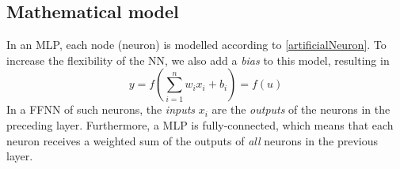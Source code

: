 \documentclass[twoside,english]{uiofysmaster}
\begin{document}
\subsection{Mathematical model} \label{sec:MLPmodel}
In an MLP, each node (neuron) is modelled according to \eqref{artificialNeuron}. To increase the flexibility of the NN,
we also add a \textit{bias} to this model, resulting in 
\begin{equation}
 y = f\left(\sum_{i=1}^n w_ix_i + b_i\right) = f(u)
 \label{artificialNeuron2}
\end{equation}
In a FFNN of such neurons, the \textit{inputs} $x_i$
are the \textit{outputs} of the neurons in the preceding layer. Furthermore, a MLP is fully-connected, 
which means that each neuron receives a weighted sum of the outputs of \textit{all} neurons in the previous layer. 
\end{document}
